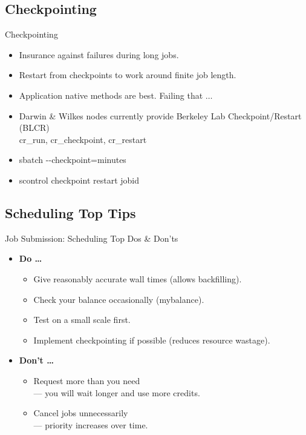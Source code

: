 \subsection{Checkpointing}
\begin{frame}{Checkpointing}
  \begin{itemize}
  \item{Insurance against failures during long jobs.}
  \item{Restart from checkpoints to work around finite job length.}
    \pause
  \item{Application native methods are best. Failing that $\ldots$}
    \pause
  \item{Darwin \& Wilkes nodes currently provide Berkeley Lab Checkpoint/Restart (BLCR)\hfill\\
  \qquad\alert{cr\_run, cr\_checkpoint, cr\_restart}}
    \item{\alert{sbatch -{}-checkpoint=minutes}}
    \item{\alert{scontrol checkpoint restart jobid}}
  \end{itemize}
\end{frame}

\subsection{Scheduling Top Tips}
\begin{frame}{Job Submission: Scheduling Top Dos \& Don'ts}
\begin{itemize}
\item{\textbf{Do \ldots}}
\begin{itemize}
\item{Give reasonably accurate wall times (allows \alert{backfilling}).}
\item{Check your balance occasionally (\alert{mybalance}).}
\item{Test on a small scale first.}
\item{Implement \alert{checkpointing} if possible (reduces resource wastage).}
\end{itemize}
\medskip
\item{\textbf{Don't \ldots}}
\begin{itemize}
\item{Request more than you need\hfill\\
\qquad --- you will wait longer and use more credits.}
\item{Cancel jobs unnecessarily\hfill\\
\qquad ---  priority increases over time.}
\end{itemize}
\end{itemize}
\end{frame}
